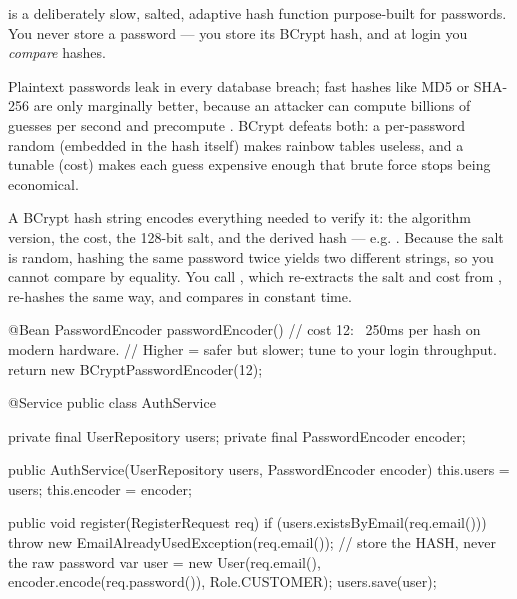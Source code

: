 
  is a deliberately slow, salted, adaptive hash function purpose-built for passwords. You never store a password --- you store its BCrypt hash, and at login you \emph{compare} hashes.

 Plaintext passwords leak in every database breach; fast hashes like MD5 or SHA-256 are only marginally better, because an attacker can compute billions of guesses per second and precompute . BCrypt defeats both: a per-password random  (embedded in the hash itself) makes rainbow tables useless, and a tunable  (cost) makes each guess expensive enough that brute force stops being economical.

 A BCrypt hash string encodes everything needed to verify it: the algorithm version, the cost, the 128-bit salt, and the derived hash --- e.g. . Because the salt is random, hashing the same password twice yields two different strings, so you cannot compare by equality. You call , which re-extracts the salt and cost from , re-hashes  the same way, and compares in constant time.

\begin{javabox}
@Bean
PasswordEncoder passwordEncoder() {
  // cost 12: ~250ms per hash on modern hardware.
  // Higher = safer but slower; tune to your login throughput.
  return new BCryptPasswordEncoder(12);
}
\end{javabox}

\begin{javabox}
@Service
public class AuthService {
  private final UserRepository users;
  private final PasswordEncoder encoder;

  public AuthService(UserRepository users, PasswordEncoder encoder) {
    this.users = users;
    this.encoder = encoder;
  }

  public void register(RegisterRequest req) {
    if (users.existsByEmail(req.email()))
      throw new EmailAlreadyUsedException(req.email());
    // store the HASH, never the raw password
    var user = new User(req.email(),
                        encoder.encode(req.password()),
                        Role.CUSTOMER);
    users.save(user);
  }
}
\end{javabox}

